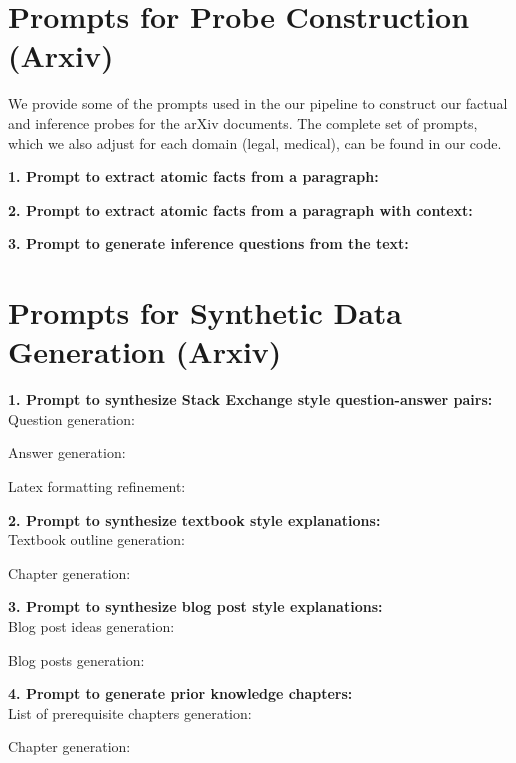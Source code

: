 \documentclass[11pt]{article}
\begin{document}
\section{Prompts for Probe Construction (Arxiv)}\label{Appendix:Probes}

We provide some of the prompts used in the our pipeline to construct our factual and inference probes for the arXiv documents. The complete set of prompts, which we also adjust for each domain (legal, medical), can be found in our code.%

\textbf{1. Prompt to extract atomic facts from a paragraph:}


\textbf{2. Prompt to extract atomic facts from a paragraph with context:}


\textbf{3. Prompt to generate inference questions from the text:}



\section{Prompts for Synthetic Data Generation (Arxiv)}\label{Appendix:Prompts} %

\textbf{1. Prompt to synthesize Stack Exchange style question-answer pairs:}
\\Question generation:


Answer generation:


Latex formatting refinement:


\textbf{2. Prompt to synthesize textbook style explanations:}
\\Textbook outline generation:


Chapter generation:


\textbf{3. Prompt to synthesize blog post style explanations:}
\\Blog post ideas generation:


Blog posts generation:


\textbf{4. Prompt to generate prior knowledge chapters:}
\\List of prerequisite chapters generation:


Chapter generation:

\end{document}
